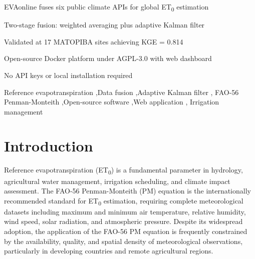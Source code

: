 \documentclass[preprint,review,12pt]{elsarticle}
\begin{document}
\begin{frontmatter}
\begin{graphicalabstract}
\end{graphicalabstract}

\begin{highlights}
\item EVAonline fuses six public climate APIs for global ET\textsubscript{0} estimation
\item Two-stage fusion: weighted averaging plus adaptive Kalman filter
\item Validated at 17 MATOPIBA sites achieving KGE = 0.814
\item Open-source Docker platform under AGPL-3.0 with web dashboard
\item No API keys or local installation required
\end{highlights}

\begin{keyword}
Reference evapotranspiration \sep Data fusion \sep Adaptive Kalman filter \sep
FAO-56 Penman-Monteith \sep Open-source software \sep Web application \sep
Irrigation management
\end{keyword}

\end{frontmatter}

\linenumbers

\section{Introduction}
\label{sec:introduction}

Reference evapotranspiration (ET\textsubscript{0}) is a fundamental parameter
in hydrology, agricultural water management, irrigation scheduling, and
climate impact assessment. The FAO-56 Penman-Monteith (PM) equation
\citep{Allen1998} is the internationally recommended standard for
ET\textsubscript{0} estimation, requiring complete meteorological datasets
including maximum and minimum air temperature, relative humidity, wind speed,
solar radiation, and atmospheric pressure. Despite its widespread adoption, the
application of the FAO-56 PM equation is frequently constrained by the
availability, quality, and spatial density of meteorological observations,
particularly in developing countries and remote agricultural regions.
\end{document}
